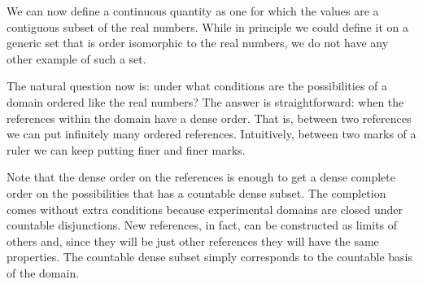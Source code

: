 \documentclass[11pt,letterpaper,fleqn]{memoir} %
\begin{document}
We can now define a continuous quantity as one for which the values are a contiguous subset of the real numbers. While in principle we could define it on a generic set that is order isomorphic to the real numbers, we do not have any other example of such a set.

The natural question now is: under what conditions are the possibilities of a domain ordered like the real numbers? The answer is straightforward: when the references within the domain have a dense order. That is, between two references we can put infinitely many ordered references. Intuitively, between two marks of a ruler we can keep putting finer and finer marks.

Note that the dense order on the references is enough to get a dense complete order on the possibilities that has a countable dense subset. The completion comes without extra conditions because experimental domains are closed under countable disjunctions. New references, in fact, can be constructed as limits of others and, since they will be just other references they will have the same properties. The countable dense subset simply corresponds to the countable basis of the domain.
\end{document}
